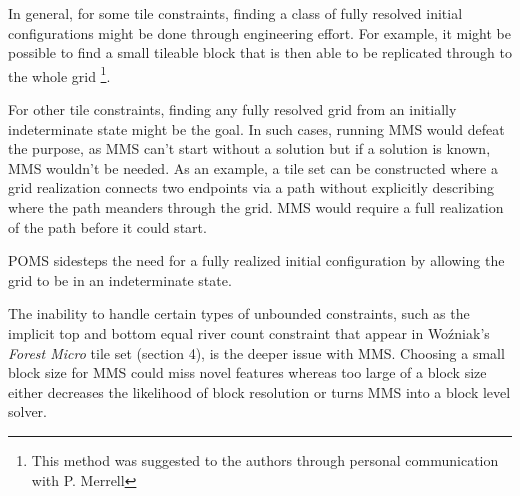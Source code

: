 In general, for some tile constraints, finding a class of fully resolved initial configurations might be done through engineering effort.
For example, it might be possible to find a small tileable block that is then able to be replicated through to the whole grid
\footnote{ This method was suggested to the authors through personal communication with P. Merrell }.

For other tile constraints, finding any fully resolved grid from an initially indeterminate state might be the goal.
In such cases, running MMS would defeat the purpose, as MMS can't start without a solution but if a solution is known, MMS wouldn't
be needed.
As an example, a tile set can be constructed where a grid realization connects two endpoints via a path
without explicitly describing where the path meanders through the grid.
MMS would require a full realization of the path before it could start.


POMS sidesteps the need for a fully realized initial configuration by allowing the grid to be in an indeterminate state.


The inability to handle certain types of unbounded constraints, such as the implicit top and bottom equal river count constraint that appear in
Wo\'zniak's \textit{Forest Micro} tile set (section 4), is the deeper issue with MMS.
Choosing a small block size for MMS could miss novel features whereas too large of a block size either decreases
the likelihood of block resolution or turns MMS into a block level solver.


